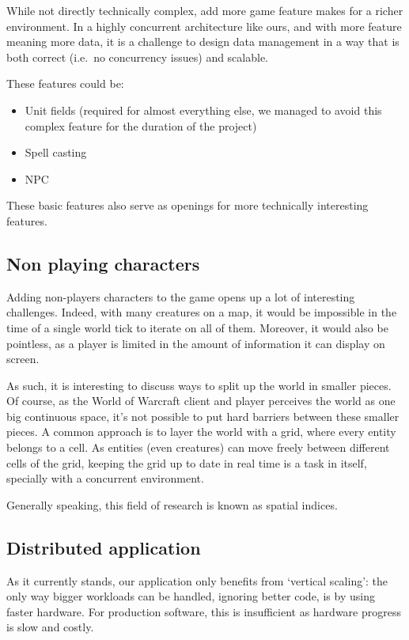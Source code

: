 \documentclass[paper=a4, fontsize=11pt]{scrartcl}
\begin{document}
While not directly technically complex, add more game feature makes for a
richer environment. In a highly concurrent architecture like ours, and with more
feature meaning more data, it is a challenge to design data management in a way
that is both correct (i.e.\ no concurrency issues) and scalable.

These features could be:
\begin{itemize}
    \item Unit fields (required for almost everything else, we managed to avoid
        this complex feature for the duration of the project)
    \item Spell casting
    \item \gls{NPC}
\end{itemize}

These basic features also serve as openings for more technically interesting
features.

\subsection{Non playing characters}

Adding non-players characters to the game opens up a lot of interesting
challenges.
Indeed, with many creatures on a map, it would be impossible in the time of a
single world tick to iterate on all of them.
Moreover, it would also be pointless, as a player is limited in the amount of
information it can display on screen.

As such, it is interesting to discuss ways to split up the world in smaller
pieces.
Of course, as the World of Warcraft client and player perceives the world
as one big continuous space, it's not possible to put hard barriers between
these smaller pieces.
A common approach is to layer the world with a grid, where every entity belongs
to a cell. As entities (even creatures) can move freely between different cells 
of the grid, keeping the grid up to date in real time is a task in itself,
specially with a concurrent environment.

Generally speaking, this field of research is known as spatial indices.

\subsection{Distributed application}

As it currently stands, our application only benefits from `vertical scaling':
the only way bigger workloads can be handled, ignoring better code, is by using
faster hardware.
For production software, this is insufficient as hardware progress is slow
and costly.
\end{document}
